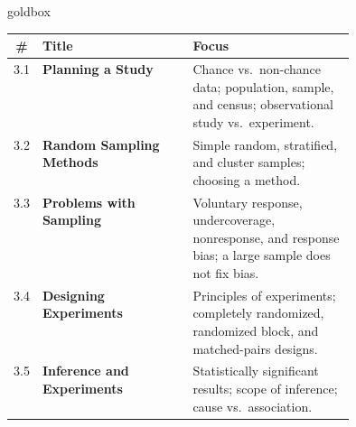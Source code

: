 \documentclass[10pt]{article}
\begin{document}
\renewcommand{\arraystretch}{1.6}
\begin{skillbox}{goldbox}
\begin{tabularx}{\linewidth}{@{} c >{\bfseries}p{0.44\linewidth} X @{}}
  \textbf{\#} & \textbf{Title} & \textbf{Focus} \\
  \hline
  3.1 & Planning a Study
    & Chance vs.\ non-chance data; population, sample, and census; observational study vs.\ experiment. \\
  \hline
  3.2 & Random Sampling Methods
    & Simple random, stratified, and cluster samples; choosing a method. \\
  \hline
  3.3 & Problems with Sampling
    & Voluntary response, undercoverage, nonresponse, and response bias; a large sample does not fix bias. \\
  \hline
  3.4 & Designing Experiments
    & Principles of experiments; completely randomized, randomized block, and matched-pairs designs. \\
  \hline
  3.5 & Inference and Experiments
    & Statistically significant results; scope of inference; cause vs.\ association. \\
  \hline
\end{tabularx}
\end{skillbox}

\vspace{0.18in}
\end{document}
